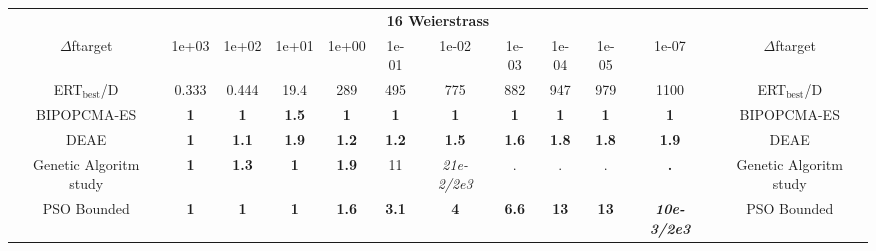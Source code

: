 \begin{tabular}{cccccccccccc}
 & \multicolumn{10}{c}{{\normalsize \textbf{16 Weierstrass}}}\\
$\Delta$ftarget& 1e+03& 1e+02& 1e+01& 1e+00& 1e-01& 1e-02& 1e-03& 1e-04& 1e-05& 1e-07 & $\Delta$ftarget \\
ERT$_{\textrm{best}}$/D& 0.333& 0.444& 19.4& 289& 495& 775& 882& 947& 979& 1100 & ERT$_{\textrm{best}}$/D \\
\hline
BIPOPCMA-ES & \textbf{1} & \textbf{1} & \textbf{1.5} & \textbf{1} & \textbf{1} & \textbf{1} & \textbf{1} & \textbf{1} & \textbf{1} & \textbf{1} & BIPOPCMA-ES \cite{add_an_entry_for_BIPOPCMA-ES_in_bbob.bib}\\
DEAE & \textbf{1} & \textbf{1.1} & \textbf{1.9} & \textbf{1.2} & \textbf{1.2} & \textbf{1.5} & \textbf{1.6} & \textbf{1.8} & \textbf{1.8} & \textbf{1.9} & DEAE \cite{add_an_entry_for_DEAE_in_bbob.bib}\\
Genetic Algoritm study & \textbf{1} & \textbf{1.3} & \textbf{1} & \textbf{1.9} & 11 & \textit{21e-2}\textit{/2e3} & . & . & . & \textbf{.} & Genetic Algoritm study \cite{add_an_entry_for_Genetic Algoritm study_in_bbob.bib}\\
PSO Bounded & \textbf{1} & \textbf{1} & \textbf{1} & \textbf{1.6} & \textbf{3.1} & \textbf{4} & \textbf{6.6} & \textbf{13} & \textbf{13} & \textbf{\textit{10e-3}\textit{/2e3}} & PSO Bounded \cite{add_an_entry_for_PSO Bounded_in_bbob.bib}
\end{tabular}
